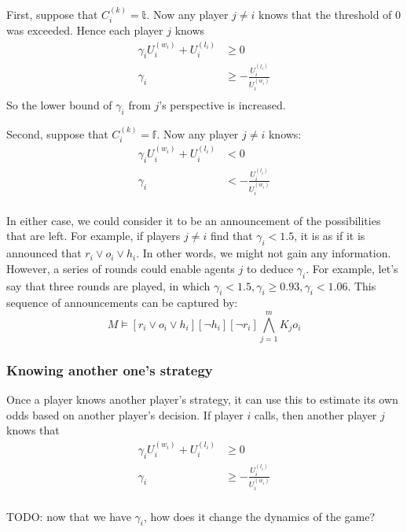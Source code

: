 \documentclass[a4paper,10pt]{article}
\begin{document}
First, suppose that $C^{(k)}_i = \mathbb{t}$. Now any player $j\neq i$ knows that the threshold of 0 was exceeded. Hence each player $j$ knows 
\begin{align*}
\gamma_i U^{(w_i)}_i + U^{(l_i)}_i &\geq 0\\
\gamma_i &\geq -\frac{U^{(l_i)}_i }{U^{(w_i)}_i}\\
\end{align*}
So the lower bound of $\gamma_i$ from $j$'s perspective is increased.

Second, suppose that $C^{(k)}_i = \mathbb{f}$. Now any player $j\neq i$ knows:
\begin{align*}
\gamma_i U^{(w_i)}_i + U^{(l_i)}_i &< 0\\
\gamma_i &< -\frac{U^{(l_i)}_i }{U^{(w_i)}_i}\\
\end{align*}

In either case, we could consider it to be an announcement of the possibilities that are left. For example, if players $j\neq i$ find that $\gamma_i < 1.5$, it is as if it is announced that $r_i \vee o_i \vee h_i$. In other words, we might not gain any information. However, a series of rounds could enable agents $j$ to deduce $\gamma_i$. For example, let's say that three rounds are played, in which $\gamma_i < 1.5,\gamma_i \geq 0.93,\gamma_i < 1.06$. This sequence of announcements can be captured by:
\begin{equation*}
M\models [r_i \vee o_i \vee h_i][\neg h_i][\neg r_i] \bigwedge_{j=1}^m K_j o_i
\end{equation*}

\subsubsection{Knowing another one's strategy}
Once a player knows another player's strategy, it can use this to estimate its own odds based on another player's decision. If player $i$ calls, then another player $j$ knows that 
\begin{align*}
\gamma_i U^{(w_i)}_i + U^{(l_i)}_i &\geq 0\\
\gamma_i &\geq -\frac{U^{(l_i)}_i }{U^{(w_i)}_i}\\
\end{align*}

TODO: now that we have $\gamma_i$, how does it change the dynamics of the game?

\begin{comment}
\begin{figure}[!h]
 \centering
\begin{tikzpicture}
  \node [mystate] (a) at (0,0) {$\bullet$};
  \node [mystate] (b) at (5,0) {$\bullet$};
  \draw (a) node[below] {$\neg p, q, \neg r$};
  \draw (b) node[below] {$p, q, r$};
  \draw (a) node[above] {$w_1$};
  \draw (b) node[above] {$w_2$};
  \draw (a) to node[below] {$b$} (b);
\end{tikzpicture}
\caption{Simple world}
\label{fig:wrld}
\end{figure}
\end{comment}
\end{document}
